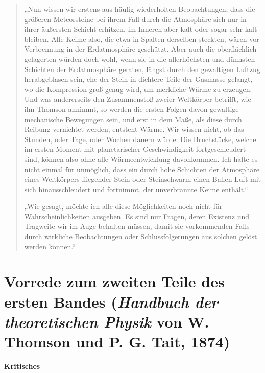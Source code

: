 \documentclass[a4paper, 11pt, oneside, german]{article}
\begin{document}
\begin{quotation}
„Nun wissen wir erstens aus häufig wiederholten Beobachtungen, dass die größeren Meteorsteine bei ihrem Fall durch die Atmosphäre sich nur in ihrer äußersten Schicht erhitzen, im Inneren aber kalt oder sogar sehr kalt bleiben. Alle Keime also, die etwa in Spalten derselben steckten, wären vor Verbrennung in der Erdatmosphäre geschützt. Aber auch die oberflächlich gelagerten würden doch wohl, wenn sie in die allerhöchsten und dünnsten Schichten der Erdatmosphäre geraten, längst durch den gewaltigen Luftzug herabgeblasen sein, ehe der Stein in dichtere Teile der Gasmasse gelangt, wo die Kompression groß genug wird, um merkliche Wärme zu erzeugen. Und was andererseits den Zusammenstoß zweier Weltkörper betrifft, wie ihn Thomson annimmt, so werden die ersten Folgen davon gewaltige mechanische Bewegungen sein, und erst in dem Maße, als diese durch Reibung vernichtet werden, entsteht Wärme. Wir wissen nicht, ob das Stunden, oder Tage, oder Wochen dauern würde. Die Bruchstücke, welche im ersten Moment mit planetarischer Geschwindigkeit fortgeschleudert sind, können also ohne alle Wärmeentwicklung davonkommen. Ich halte es nicht einmal für unmöglich, dass ein durch hohe Schichten der Atmosphäre eines Weltkörpers fliegender Stein oder Steinschwarm einen Ballen Luft mit sich hinausschleudert und fortnimmt, der unverbrannte Keime enthält.“

„Wie gesagt, möchte ich alle diese Möglichkeiten noch nicht für Wahrscheinlichkeiten ausgeben. Es sind nur Fragen, deren Existenz und Tragweite wir im Auge behalten müssen, damit sie vorkommenden Falls durch wirkliche Beobachtungen oder Schlussfolgerungen aus solchen gelöst werden können.“
\end{quotation}
\clearpage
\section*{Vorrede zum zweiten Teile des ersten Bandes (\emph{Handbuch der theoretischen Physik} von W. Thomson und P. G. Tait, 1874)}
\begin{center}
\textbf{Kritisches}
\end{center}
\end{document}

